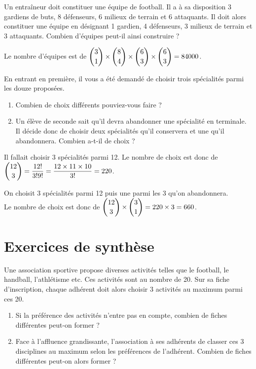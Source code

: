 \documentclass[11pt,fleqn, openany]{book} %
\begin{document}
\begin{exercise}Un entraîneur doit constituer une équipe de football. Il a à sa disposition 3 gardiens de buts, 8 défenseurs, 6 milieux de terrain et 6 attaquants. Il doit alors constituer une équipe en désignant 1 gardien, 4 défenseurs, 3 milieux de terrain et 3 attaquants. Combien d'équipes peut-il ainsi construire ?\end{exercise}

\begin{solution}Le nombre d'équipes est de $\dbinom{3}{1} \times \dbinom{8}{4} \times \dbinom{6}{3} \times \dbinom{6}{3} = 84000$.\end{solution}




\begin{exercise}En entrant en première, il vous a été demandé de choisir trois spécialités parmi les douze proposées.
\begin{enumerate}
\item Combien de choix différents pouviez-vous faire ?
\item Un élève de seconde sait qu'il devra abandonner une spécialité en terminale. Il décide donc de choisir deux spécialités qu'il conservera et une qu'il abandonnera. Combien a-t-il de choix ?
\end{enumerate}\end{exercise}

\begin{solution}Il fallait choisir 3 spécialités parmi 12. Le nombre de choix est donc de $\dbinom{12}{3}=\dfrac{12!}{3!9!}=\dfrac{12 \times 11 \times 10}{3!}=220$.

On choisit 3 spécialités parmi 12 puis une parmi les 3 qu'on abandonnera. \\Le nombre de choix est donc de $\dbinom{12}{3} \times \dbinom{3}{1}=220 \times 3 = 660$.\end{solution}



\section*{Exercices de synthèse}



\begin{exercise}
Une association sportive propose diverses activités telles que le football, le handball, l'athlétisme etc. Ces activités sont au nombre de 20. Sur sa fiche d'inscription, chaque adhérent doit alors choisir 3 activités au maximum parmi ces 20.

\begin{enumerate}
\item Si la préférence des activités n'entre pas en compte, combien de fiches différentes peut-on former ?
\item Face à l'affluence grandissante, l'association à ses adhérents de classer ces 3 disciplines au maximum selon les préférences de l'adhérent. Combien de fiches différentes peut-on alors former ?
\end{enumerate}\end{exercise}
\end{document}
